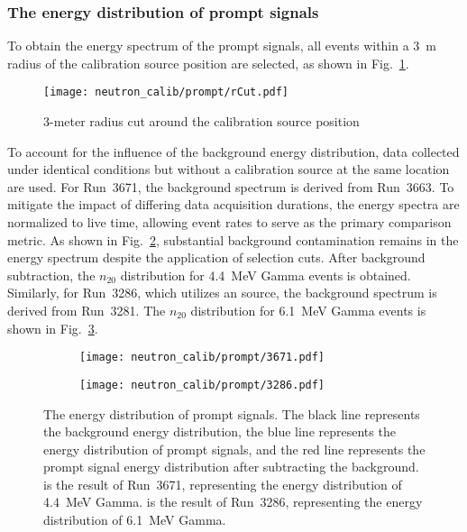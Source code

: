 \subsubsection{The energy distribution of prompt signals}
To obtain the energy spectrum of the prompt signals, all events within a \SI{3}{m} radius of the calibration source position are selected, as shown in Fig.~\ref{fig:RtoSource}.
\begin{figure}[h]
	\centering
	\texttt{[image: neutron\_calib/prompt/rCut.pdf]}
	\caption{3-meter radius cut around the calibration source position}
	\label{fig:RtoSource}
\end{figure}
To account for the influence of the background energy distribution, data collected under identical conditions but without a calibration source at the same location are used.
For Run~3671, the background spectrum is derived from Run~3663.
To mitigate the impact of differing data acquisition durations, the energy spectra are normalized to live time, allowing event rates to serve as the primary comparison metric.
As shown in Fig.~\ref{fig:3671n20}, substantial background contamination remains in the energy spectrum despite the application of selection cuts.
After background subtraction, the $n_{20}$ distribution for \SI{4.4}{MeV} Gamma events is obtained. Similarly, for Run~3286, which utilizes an  source, the background spectrum is derived from Run~3281. The $n_{20}$ distribution for \SI{6.1}{MeV} Gamma events is shown in Fig.~\ref{fig:3286n20}.
\begin{figure}[h]
	\centering
	\begin{subfigure}{0.5\textwidth}
		\centering
		\texttt{[image: neutron\_calib/prompt/3671.pdf]}
		\caption{}
		\label{fig:3671n20}
	\end{subfigure}%
	\begin{subfigure}{0.5\textwidth}
		\centering
		\texttt{[image: neutron\_calib/prompt/3286.pdf]}
		\caption{}
		\label{fig:3286n20}
	\end{subfigure}
	\caption{The energy distribution of prompt signals. The black line represents the background energy distribution, the blue line represents the energy distribution of prompt signals, and the red line represents the prompt signal energy distribution after subtracting the background.  is the result of Run~3671, representing the energy distribution of \SI{4.4}{MeV} Gamma.  is the result of Run~3286, representing the energy distribution of \SI{6.1}{MeV} Gamma.}
	\label{fig:n20}
\end{figure}


